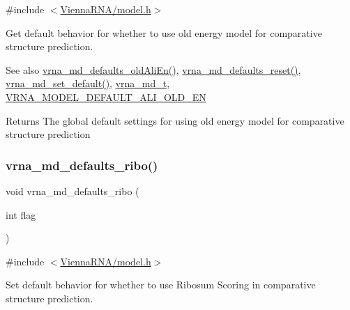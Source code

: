 {\ttfamily \#include $<$\hyperlink{model_8h}{Vienna\+R\+N\+A/model.\+h}$>$}



Get default behavior for whether to use old energy model for comparative structure prediction. 

\begin{DoxySeeAlso}{See also}
\hyperlink{group__model__details_ga41521d5b9fb7e0f31e7ea73f5792afab}{vrna\+\_\+md\+\_\+defaults\+\_\+old\+Ali\+En()}, \hyperlink{group__model__details_ga70834424cf804d149937de89f80ceb45}{vrna\+\_\+md\+\_\+defaults\+\_\+reset()}, \hyperlink{group__model__details_ga8ac6ff84936282436f822644bf841f66}{vrna\+\_\+md\+\_\+set\+\_\+default()}, \hyperlink{group__model__details_ga1f8a10e12a0a1915f2a4eff0b28ea17c}{vrna\+\_\+md\+\_\+t}, \hyperlink{group__model__details_ga2a5bbfc1edf33077e39466d2d9807115}{V\+R\+N\+A\+\_\+\+M\+O\+D\+E\+L\+\_\+\+D\+E\+F\+A\+U\+L\+T\+\_\+\+A\+L\+I\+\_\+\+O\+L\+D\+\_\+\+EN} 
\end{DoxySeeAlso}
\begin{DoxyReturn}{Returns}
The global default settings for using old energy model for comparative structure prediction 
\end{DoxyReturn}
\mbox{\label{group__model__details_ga937c45e1d06fd6168730a9b08d130be3}} 
\subsubsection{\texorpdfstring{vrna\+\_\+md\+\_\+defaults\+\_\+ribo()}{vrna\_md\_defaults\_ribo()}}
{\footnotesize\ttfamily void vrna\+\_\+md\+\_\+defaults\+\_\+ribo (\begin{DoxyParamCaption}\item[{int}]{flag }\end{DoxyParamCaption})}



{\ttfamily \#include $<$\hyperlink{model_8h}{Vienna\+R\+N\+A/model.\+h}$>$}



Set default behavior for whether to use Ribosum Scoring in comparative structure prediction. 

